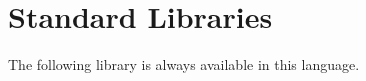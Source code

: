 









\newpage

















\section{Standard Libraries}

The following library is always available in this language.






    
